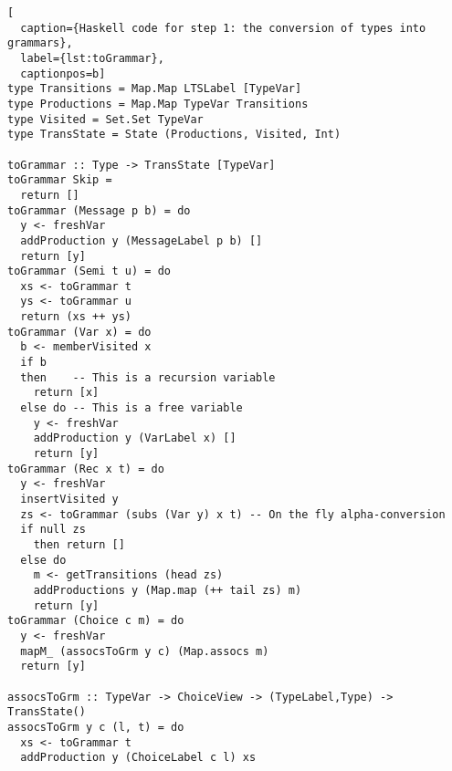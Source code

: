 \begin{lstlisting}[
  caption={Haskell code for step 1: the conversion of types into grammars},
  label={lst:toGrammar},
  captionpos=b]
type Transitions = Map.Map LTSLabel [TypeVar]
type Productions = Map.Map TypeVar Transitions
type Visited = Set.Set TypeVar
type TransState = State (Productions, Visited, Int)

toGrammar :: Type -> TransState [TypeVar]
toGrammar Skip =
  return []
toGrammar (Message p b) = do
  y <- freshVar
  addProduction y (MessageLabel p b) []
  return [y]
toGrammar (Semi t u) = do
  xs <- toGrammar t
  ys <- toGrammar u
  return (xs ++ ys)
toGrammar (Var x) = do
  b <- memberVisited x
  if b
  then    -- This is a recursion variable
    return [x]
  else do -- This is a free variable
    y <- freshVar
    addProduction y (VarLabel x) []
    return [y]
toGrammar (Rec x t) = do
  y <- freshVar
  insertVisited y
  zs <- toGrammar (subs (Var y) x t) -- On the fly alpha-conversion
  if null zs
    then return []
  else do
    m <- getTransitions (head zs)
    addProductions y (Map.map (++ tail zs) m)
    return [y]
toGrammar (Choice c m) = do
  y <- freshVar
  mapM_ (assocsToGrm y c) (Map.assocs m)
  return [y]

assocsToGrm :: TypeVar -> ChoiceView -> (TypeLabel,Type) -> TransState()
assocsToGrm y c (l, t) = do
  xs <- toGrammar t
  addProduction y (ChoiceLabel c l) xs
\end{lstlisting}

